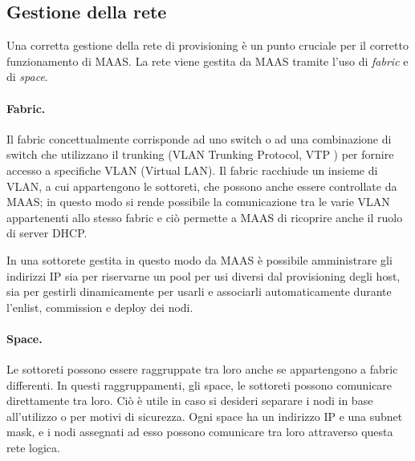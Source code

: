 \subsection{Gestione della rete} \label{subsubsec:maas_rete}
%
Una corretta gestione della rete di provisioning è un punto cruciale per il corretto funzionamento di MAAS.
% 
La rete viene gestita da MAAS tramite l'uso di \emph{fabric} e di \emph{space}.
\paragraph{Fabric.} Il fabric concettualmente corrisponde ad uno switch o ad una combinazione di switch che utilizzano il trunking (VLAN Trunking Protocol, VTP \cite{vtp}) per fornire accesso a specifiche VLAN (Virtual LAN).
%
Il fabric racchiude un insieme di VLAN, a cui appartengono le sottoreti, che possono anche essere controllate da MAAS; in questo modo si rende possibile la comunicazione tra le varie VLAN appartenenti allo stesso fabric 
e ciò permette a MAAS di ricoprire anche il ruolo di server DHCP.

In una sottorete gestita in questo modo da MAAS è possibile amministrare gli indirizzi IP sia per riservarne un pool per usi diversi dal provisioning degli host, sia per gestirli dinamicamente per usarli e associarli automaticamente durante l'enlist, commission e deploy dei nodi.

\paragraph{Space.} 
%
Le sottoreti possono essere raggruppate tra loro anche se appartengono a fabric differenti.
% 
In questi raggruppamenti, gli space, le sottoreti possono comunicare direttamente tra loro.
% 
Ciò è utile in caso si desideri separare i nodi in base all'utilizzo o per motivi di sicurezza.
% 
Ogni space ha un indirizzo IP e una subnet mask, e i nodi assegnati ad esso possono comunicare tra loro attraverso questa rete logica.
 
